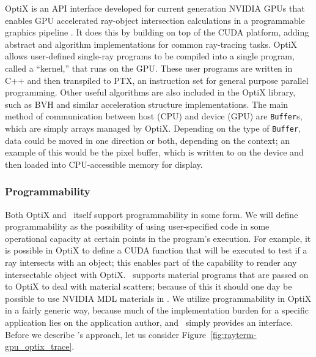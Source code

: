 OptiX is an API interface developed for current generation NVIDIA GPUs that enables GPU accelerated ray-object intersection calculations in a programmable graphics pipeline \cite{parker2010optix, nvidia2019optixdoc}.
It does this by building on top of the CUDA platform, adding abstract and algorithm implementations for common ray-tracing tasks.
OptiX allows user-defined single-ray programs to be compiled into a single program, called a ``kernel,'' that runs on the GPU.
These user programs are written in C++ and then transpiled to PTX, an instruction set for general purpose parallel programming.
Other useful algorithms are also included in the OptiX library, such as BVH and similar acceleration structure implementations.
The main method of communication between host (CPU) and device (GPU) are \texttt{Buffer}s, which are simply arrays managed by OptiX.
Depending on the type of \texttt{Buffer}, data could be moved in one direction or both, depending on the context; an example of this would be the pixel buffer, which is written to on the device and then loaded into CPU-accessible memory for display.

\subsubsection{Programmability} \label{ch:methods:renderer:parallel:program}

Both OptiX and \name\ itself support programmability in some form.
We will define programmability as the possibility of using user-specified code in some operational capacity at certain points in the program's execution.
For example, it is possible in OptiX to define a CUDA function that will be executed to test if a ray intersects with an object; this enables part of the capability to render any intersectable object with OptiX.
\name\ supports material programs that are passed on to OptiX to deal with material scatters; because of this it should one day be possible to use NVIDIA MDL materials \cite{nvidia2015mdl} in \name.
We utilize programmability in OptiX in a fairly generic way, because much of the implementation burden for a specific application lies on the application author, and \name\ simply provides an interface.
Before we describe \name's approach, let us consider Figure~\ref{fig:rayterm-gpu_optix_trace}.


